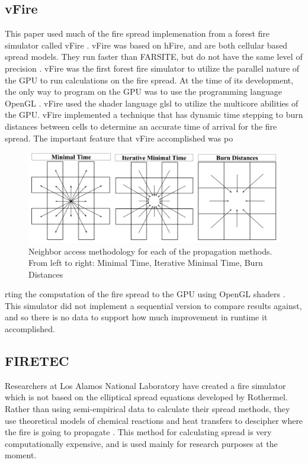 \subsection{vFire}
This paper used much of the fire spread implemenation from a forest fire simulator called vFire \cite{vFire}. vFire was based on hFire, and are both cellular based spread models. They run faster than FARSITE, but do not have the same level of precision \cite{hFire}. vFire was the first forest fire simulator to utilize the parallel nature of the GPU to run calculations on the fire spread. At the time of its development, the only way to program on the GPU was to use the programming language OpenGL \cite{opengl}. vFire used the shader language glsl to utilize the multicore abilities of the GPU. vFire implemented a technique that has dynamic time stepping to burn distances between cells to determine an accurate time of arrival for the fire spread. The important feature that vFire accomplished was po\begin{figure}%
\centering
\includegraphics[width=\linewidth]{figures/background/spread_methods.PNG}
\caption{Neighbor access methodology for each of the propagation methods. From left to right: Minimal Time, Iterative Minimal Time, Burn Distances}
\label{fig:spreadTypes}
\end{figure}rting the computation of the fire spread to the GPU using OpenGL shaders \cite{opengl}. This simulator did not implement a sequential version to compare results against, and so there is no data to support how much improvement in runtime it accomplished. 

\subsection{FIRETEC}
Researchers at Los Alamos National Laboratory have created a fire simulator which is not based on the elliptical spread equations developed by Rothermel. Rather than using semi-empirical data to calculate their spread methods, they use theoretical models of chemical reactions and heat transfers to descipher where the fire is going to propagate \cite{firetech}. This method for calculating spread is very computationally expensive, and is used mainly for research purposes at the moment. 

